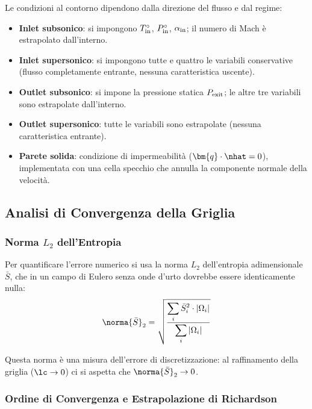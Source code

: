 Le condizioni al contorno dipendono dalla direzione del flusso e dal regime:
\begin{itemize}
  \item \textbf{Inlet subsonico}: si impongono $T^\circ_{\rm in}$, $P^\circ_{\rm in}$,
    $\alpha_{\rm in}$; il numero di Mach è estrapolato dall'interno.
  \item \textbf{Inlet supersonico}: si impongono tutte e quattro le variabili conservative
    (flusso completamente entrante, nessuna caratteristica uscente).
  \item \textbf{Outlet subsonico}: si impone la pressione statica $P_{\rm exit}$;
    le altre tre variabili sono estrapolate dall'interno.
  \item \textbf{Outlet supersonico}: tutte le variabili sono estrapolate (nessuna
    caratteristica entrante).
  \item \textbf{Parete solida}: condizione di impermeabilità ($\bm{q}\cdot\nhat = 0$),
    implementata con una cella specchio che annulla la componente normale della velocità.
\end{itemize}

\subsection{Analisi di Convergenza della Griglia}

\subsubsection{Norma $L_2$ dell'Entropia}

Per quantificare l'errore numerico si usa la norma $L_2$ dell'entropia adimensionale $\bar{S}$,
che in un campo di Eulero senza onde d'urto dovrebbe essere identicamente nulla:
\begin{equation}
  \norma{\bar{S}}_2 = \sqrt{\frac{\displaystyle\sum_i \bar{S}_i^2 \cdot |\Omega_i|}
                                  {\displaystyle\sum_i |\Omega_i|}}
  \label{eq:norma_entropia}
\end{equation}

Questa norma è una misura dell'errore di discretizzazione: al raffinamento della griglia
($\lc \to 0$) ci si aspetta che $\norma{\bar{S}}_2 \to 0$.

\subsubsection{Ordine di Convergenza e Estrapolazione di Richardson}

